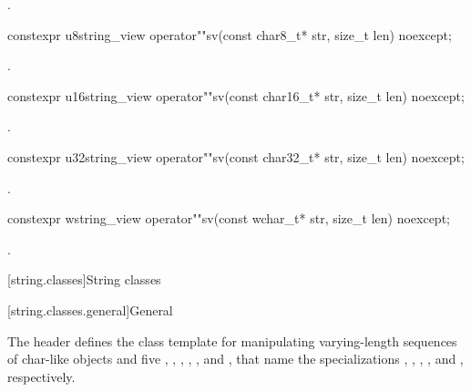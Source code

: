 \begin{itemdescr}
\pnum
\returns
{}.
\end{itemdescr}

%
\begin{itemdecl}
constexpr u8string_view operator""sv(const char8_t* str, size_t len) noexcept;
\end{itemdecl}
\begin{itemdescr}
\pnum
\returns
{}.
\end{itemdescr}

%
\begin{itemdecl}
constexpr u16string_view operator""sv(const char16_t* str, size_t len) noexcept;
\end{itemdecl}
\begin{itemdescr}
\pnum
\returns
{}.
\end{itemdescr}

%
\begin{itemdecl}
constexpr u32string_view operator""sv(const char32_t* str, size_t len) noexcept;
\end{itemdecl}
\begin{itemdescr}
\pnum
\returns
{}.
\end{itemdescr}

%
\begin{itemdecl}
constexpr wstring_view operator""sv(const wchar_t* str, size_t len) noexcept;
\end{itemdecl}
\begin{itemdescr}
\pnum
\returns
{}.
\end{itemdescr}

[string.classes]{String classes}

[string.classes.general]{General}

\pnum
The header  defines the
 class template for manipulating
varying-length sequences of char-like objects and five
, ,
,
,
,
and , that name
the specializations
,
,
,
,
and
, respectively.

